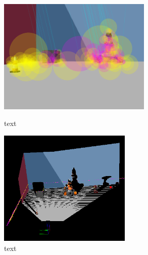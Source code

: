 \documentclass[a4paper]{article}
\begin{document}
\begin{figure}[h]
\centering
\begin{minipage}{0.45\textwidth}
\centering
\includegraphics[height=5.5cm]{slam_house_features_corner_1}
\caption{text}
\end{minipage}
\hspace{1cm}
\begin{minipage}{0.45\textwidth}
\centering
\includegraphics[height=5.5cm]{slam_house_constraints_1}
\caption{text}
\end{minipage}
\end{figure}
\end{document}
